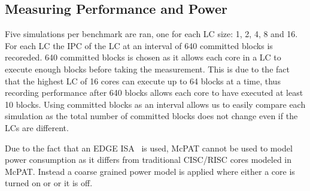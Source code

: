 
\subsection{Measuring Performance and Power}

Five simulations per benchmark are ran, one for each LC size: 1, 2, 4, 8 and 16.
For each LC the IPC of the LC at an interval of 640 committed blocks is recoreded.
640 committed blocks is chosen as it allows each core in a LC to execute enough blocks before taking the measurement.
This is due to the fact that the highest LC of 16 cores can execute up to 64 blocks at a time, thus recording performance after 640 blocks allows each core to have executed at least 10 blocks.
Using committed blocks as an interval allows us to easily compare each simulation as the total number of committed blocks does not change even if the LCs are different.

Due to the fact that an EDGE ISA~\cite{smith2006edge} is used, McPAT cannot be used to model power consumption as it differs from traditional CISC/RISC cores modeled in McPAT.
Instead a coarse grained power model is applied where either a core is turned on or or it is off. 

